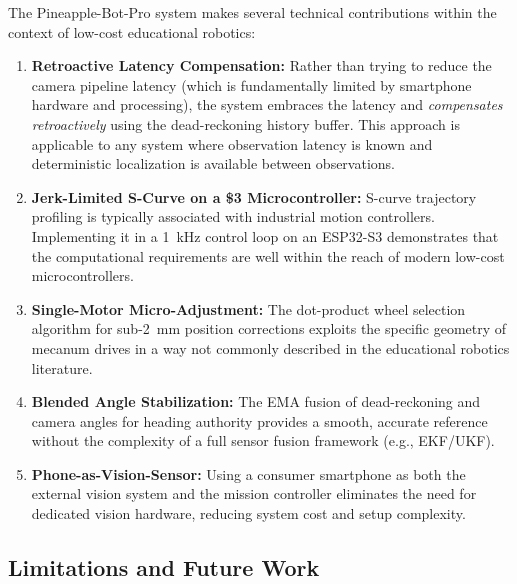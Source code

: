 \documentclass[12pt, a4paper, twoside]{article}
\begin{document}
The Pineapple-Bot-Pro system makes several technical contributions within the context of low-cost educational robotics:

\begin{enumerate}
    \item \textbf{Retroactive Latency Compensation:} Rather than trying to reduce the camera pipeline latency (which is fundamentally limited by smartphone hardware and processing), the system embraces the latency and \emph{compensates retroactively} using the dead-reckoning history buffer. This approach is applicable to any system where observation latency is known and deterministic localization is available between observations.

    \item \textbf{Jerk-Limited S-Curve on a \$3 Microcontroller:} S-curve trajectory profiling is typically associated with industrial motion controllers. Implementing it in a \SI{1}{\kilo\hertz} control loop on an ESP32-S3 demonstrates that the computational requirements are well within the reach of modern low-cost microcontrollers.

    \item \textbf{Single-Motor Micro-Adjustment:} The dot-product wheel selection algorithm for sub-\SI{2}{\milli\metre} position corrections exploits the specific geometry of mecanum drives in a way not commonly described in the educational robotics literature.

    \item \textbf{Blended Angle Stabilization:} The EMA fusion of dead-reckoning and camera angles for heading authority provides a smooth, accurate reference without the complexity of a full sensor fusion framework (e.g., EKF/UKF).

    \item \textbf{Phone-as-Vision-Sensor:} Using a consumer smartphone as both the external vision system and the mission controller eliminates the need for dedicated vision hardware, reducing system cost and setup complexity.
\end{enumerate}

\subsection{Limitations and Future Work}
\end{document}
